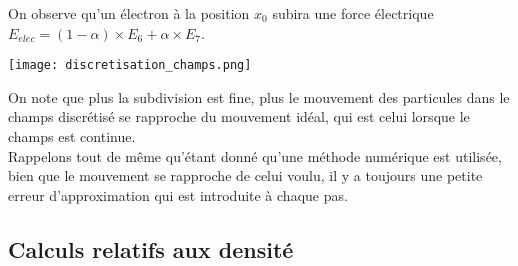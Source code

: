 \documentclass{article}
\begin{document}
On observe qu'un électron à la position $x_0$ subira une force électrique $E_{elec} = (1 - \alpha) \times E_6 + \alpha \times E_7$.
\begin{center}
\texttt{[image: discretisation\_champs.png]}
\end{center}
On note que plus la subdivision est fine, plus le mouvement des particules dans le champs discrétisé se rapproche du mouvement idéal, qui est celui lorsque le champs est continue.\\
Rappelons tout de même qu'étant donné qu'une méthode numérique est utilisée, bien que le mouvement se rapproche de celui voulu, il y a toujours une petite erreur d'approximation qui est introduite à chaque pas.
\subsection{Calculs relatifs aux densité}
\end{document}
